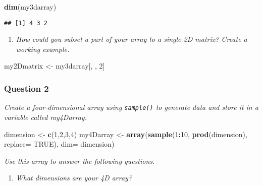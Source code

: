 \documentclass[
]{article}
\newenvironment{Shaded}{\begin{snugshade}}{\end{snugshade}}
\newcommand{\AttributeTok}[1]{\textcolor[rgb]{0.13,0.29,0.53}{#1}}
\newcommand{\ConstantTok}[1]{\textcolor[rgb]{0.56,0.35,0.01}{#1}}
\newcommand{\DecValTok}[1]{\textcolor[rgb]{0.00,0.00,0.81}{#1}}
\newcommand{\FunctionTok}[1]{\textcolor[rgb]{0.13,0.29,0.53}{\textbf{#1}}}
\newcommand{\NormalTok}[1]{#1}
\newcommand{\OtherTok}[1]{\textcolor[rgb]{0.56,0.35,0.01}{#1}}
\newcommand{\SpecialCharTok}[1]{\textcolor[rgb]{0.81,0.36,0.00}{\textbf{#1}}}
\providecommand{\tightlist}{%
  \setlength{\itemsep}{0pt}\setlength{\parskip}{0pt}}
\begin{document}
\begin{Shaded}
\begin{Highlighting}[]
\FunctionTok{dim}\NormalTok{(my3darray)}
\end{Highlighting}
\end{Shaded}

\begin{verbatim}
## [1] 4 3 2
\end{verbatim}

\begin{enumerate}
\def\labelenumi{\alph{enumi}.}
\setcounter{enumi}{1}
\tightlist
\item
  \emph{How could you subset a part of your array to a single 2D matrix?
  Create a working example.}
\end{enumerate}

\begin{Shaded}
\begin{Highlighting}[]
\NormalTok{my2Dmatrix }\OtherTok{\textless{}{-}}\NormalTok{ my3darray[, , }\DecValTok{2}\NormalTok{]}
\end{Highlighting}
\end{Shaded}

\subsubsection{Question 2}\label{question-2}

\emph{Create a four-dimensional array using \texttt{sample()} to
generate data and store it in a variable called my4Darray.}

\begin{Shaded}
\begin{Highlighting}[]
\NormalTok{dimension }\OtherTok{\textless{}{-}} \FunctionTok{c}\NormalTok{(}\DecValTok{1}\NormalTok{,}\DecValTok{2}\NormalTok{,}\DecValTok{3}\NormalTok{,}\DecValTok{4}\NormalTok{)}
\NormalTok{my4Darray }\OtherTok{\textless{}{-}} \FunctionTok{array}\NormalTok{(}\FunctionTok{sample}\NormalTok{(}\DecValTok{1}\SpecialCharTok{:}\DecValTok{10}\NormalTok{, }\FunctionTok{prod}\NormalTok{(dimension), }\AttributeTok{replace=} \ConstantTok{TRUE}\NormalTok{), }\AttributeTok{dim=}\NormalTok{ dimension)}
\end{Highlighting}
\end{Shaded}

\emph{Use this array to answer the following questions.}

\begin{enumerate}
\def\labelenumi{\alph{enumi}.}
\tightlist
\item
  \emph{What dimensions are your 4D array?}
\end{enumerate}
\end{document}
